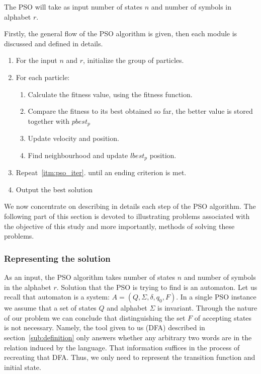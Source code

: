 \documentclass[runningheads, a4paper]{llncs}
\begin{document}
The PSO will take as input number of states $n$ and number of symbols in alphabet $r$.

Firstly, the general flow of the PSO algorithm is given, then each module is discussed and defined in details.

\begin{center}

\begin{enumerate}
	\item For the input $n$ and $r$, initialize the group of particles.

	\item For each particle: \label{itm:pso_iter}
	\begin{enumerate}
		\item Calculate the fitness value, using the fitness function.
		\item Compare the fitness to its best obtained so far, the better value is stored together with $pbest_p$	
		
		\item Update velocity and position.	
		
		\item Find neighbourhood and update $lbest_p$ position.
	\end{enumerate}		
	

	
	\item Repeat~\ref{itm:pso_iter}. until an ending criterion is met.

	\item Output the best solution	
	
\end{enumerate}

\end{center}

We now concentrate on describing in details each step of the PSO algorithm. The following part of this section is devoted to illustrating problems associated with the objective of this study and more importantly, methods of solving these problems.


\subsubsection{Representing the solution}
As an input, the PSO algorithm takes number of states $n$ and number of symbols in the alphabet $r$.
Solution that the PSO is trying to find is an automaton. Let us recall that automaton is a system: $A = (Q, \Sigma, \delta, q_0, F)$. In a single PSO instance we assume that a set of states $Q$ and alphabet $\Sigma$ is invariant. Through the nature of our problem we can conclude that distinguishing the set $F$ of accepting states is not necessary. Namely, the tool given to us (DFA) described in section~\ref{sub:definition} only answers whether any arbitrary two words are in the relation induced by the language. That information suffices in the process of recreating that DFA. Thus, we only need to represent the transition function and initial state.
\end{document}

